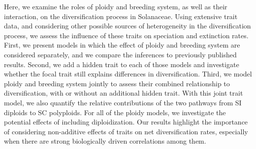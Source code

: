 Here, we examine the roles of ploidy and breeding system, as well as their interaction, on the diversification process in Solanaceae.
Using extensive trait data, and considering other possible sources of heterogeneity in the diversification process, we assess the influence of these traits on speciation and extinction rates.
First, we present models in which the effect of ploidy and breeding system are considered separately, and we compare the inferences to previously published results. 
Second, we add a hidden trait to each of those models and investigate whether the focal trait still explains differences in diversification.
Third, we model ploidy and breeding system jointly to assess their combined relationship to diversification, with or without an additional hidden trait.
With this joint trait model, we also quantify the relative contributions of the two pathways from SI diploids to SC polyploids.
For all of the ploidy models, we investigate the potential effects of including diploidization.
Our results highlight the importance of considering non-additive effects of traits on net diversification rates, especially when there are strong biologically driven correlations among them.
